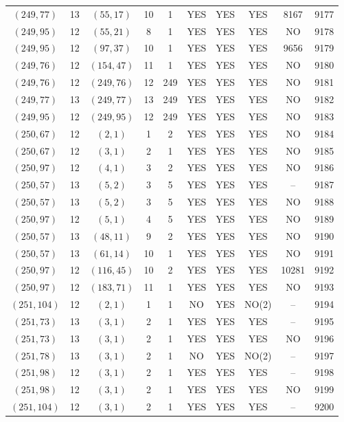 \begin{longtable}{|c|c|c|c|c|c|c|c|c|c|}
$(249, 77)$ & 13 & $(55, 17)$ & 10 & 1 & YES & YES & YES & 8167 & 9177\\
$(249, 95)$ & 12 & $(55, 21)$ & 8 & 1 & YES & YES & YES & NO & 9178\\
$(249, 95)$ & 12 & $(97, 37)$ & 10 & 1 & YES & YES & YES & 9656 & 9179\\
$(249, 76)$ & 12 & $(154, 47)$ & 11 & 1 & YES & YES & YES & NO & 9180\\
$(249, 76)$ & 12 & $(249, 76)$ & 12 & 249 & YES & YES & YES & NO & 9181\\
$(249, 77)$ & 13 & $(249, 77)$ & 13 & 249 & YES & YES & YES & NO & 9182\\
$(249, 95)$ & 12 & $(249, 95)$ & 12 & 249 & YES & YES & YES & NO & 9183\\
$(250, 67)$ & 12 & $(2, 1)$ & 1 & 2 & YES & YES & YES & NO & 9184\\
$(250, 67)$ & 12 & $(3, 1)$ & 2 & 1 & YES & YES & YES & NO & 9185\\
$(250, 97)$ & 12 & $(4, 1)$ & 3 & 2 & YES & YES & YES & NO & 9186\\
$(250, 57)$ & 13 & $(5, 2)$ & 3 & 5 & YES & YES & YES & -- & 9187\\
$(250, 57)$ & 13 & $(5, 2)$ & 3 & 5 & YES & YES & YES & NO & 9188\\
$(250, 97)$ & 12 & $(5, 1)$ & 4 & 5 & YES & YES & YES & NO & 9189\\
$(250, 57)$ & 13 & $(48, 11)$ & 9 & 2 & YES & YES & YES & NO & 9190\\
$(250, 57)$ & 13 & $(61, 14)$ & 10 & 1 & YES & YES & YES & NO & 9191\\
$(250, 97)$ & 12 & $(116, 45)$ & 10 & 2 & YES & YES & YES & 10281 & 9192\\
$(250, 97)$ & 12 & $(183, 71)$ & 11 & 1 & YES & YES & YES & NO & 9193\\
$(251, 104)$ & 12 & $(2, 1)$ & 1 & 1 & NO & YES & NO(2) & -- & 9194\\
$(251, 73)$ & 13 & $(3, 1)$ & 2 & 1 & YES & YES & YES & -- & 9195\\
$(251, 73)$ & 13 & $(3, 1)$ & 2 & 1 & YES & YES & YES & NO & 9196\\
$(251, 78)$ & 13 & $(3, 1)$ & 2 & 1 & NO & YES & NO(2) & -- & 9197\\
$(251, 98)$ & 12 & $(3, 1)$ & 2 & 1 & YES & YES & YES & -- & 9198\\
$(251, 98)$ & 12 & $(3, 1)$ & 2 & 1 & YES & YES & YES & NO & 9199\\
$(251, 104)$ & 12 & $(3, 1)$ & 2 & 1 & YES & YES & YES & -- & 9200\\

\end{longtable}
